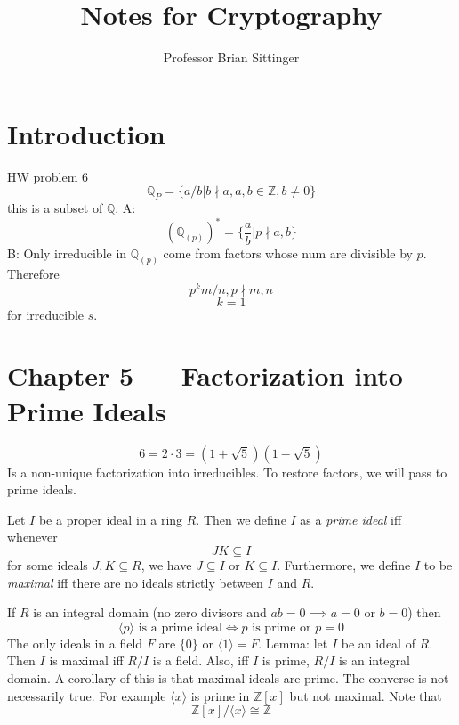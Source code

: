 \documentclass{article}
\title{Notes for Cryptography}
\author{Professor Brian Sittinger}
\date{}
\begin{document}
\maketitle
\section{Introduction}
HW problem 6 
\[ \mathbb{Q}_{P} = \{a/b | b \nmid a, a,b \in \mathbb{Z}, b \neq 0 \} \]
this is a subset of $\mathbb{Q}$. A:
\[ (\mathbb{Q}_{(p)})^* = \{ \frac{a}{b}| p\nmid a,b \} \]
B: Only irreducible in $\mathbb{Q}_{(p)}$  come from factors whose num are
divisible by $p$. Therefore 
\[ p^k m / n , p \nmid m, n \]
\[ k = 1 \]
for irreducible $s$. 

\section{Chapter 5 --- Factorization into Prime Ideals}
\[ 6 = 2 \cdot 3 = (1+\sqrt{5})(1-\sqrt{5}) \]
Is a non-unique factorization into irreducibles. To restore factors, we will
pass to prime ideals. 

Let $I$ be a proper ideal in a ring $R$. Then we define $I$ as a \emph{prime
ideal} iff whenever 
\[ JK \subseteq I \]
for some ideals $J,K \subseteq R$, we have $ J \subseteq I$ or $K \subseteq I$.
Furthermore, we define $I$ to be \emph{maximal} iff there are no ideals strictly
between $I$ and $R$. 

If $R$ is an integral domain (no zero divisors and $ab = 0 \implies a = 0$ or $b
= 0$) then 
\[ \langle p \rangle \text{ is a prime ideal} \iff p \text{ is prime or } p = 0
\]
The only ideals in a field $F$ are $\{0\}$ or $\langle 1 \rangle = F$. 
Lemma: let $I$ be an ideal of $R$. Then $I$ is maximal iff $R/I$ is a field.
Also, iff $I$ is prime, $R/I$ is an integral domain. A corollary of this is that
maximal ideals are prime. The converse is not necessarily true. For example
$\langle x \rangle$ is prime in $\mathbb{Z}[x]$ but not maximal. Note that
\[ \mathbb{Z}[x] / \langle x \rangle \cong \mathbb{Z} \]
\end{document}
